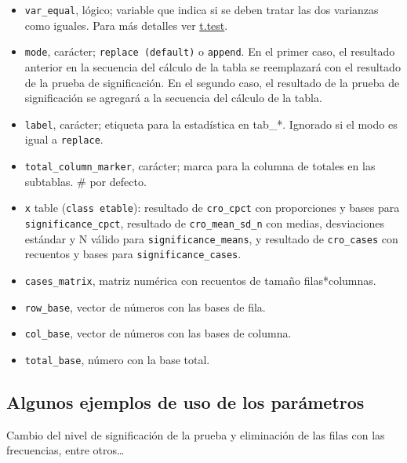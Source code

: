 \documentclass[
]{book}
\begin{document}
\begin{itemize}
\item
  \texttt{var\_equal}, lógico; variable que indica si se deben tratar las dos varianzas como iguales. Para más detalles ver \href{https://www.rdocumentation.org/packages/stats/versions/3.6.2/topics/t.test}{t.test}.
\item
  \texttt{mode}, carácter; \texttt{replace\ (default)} o \texttt{append}. En el primer caso, el resultado anterior en la secuencia del cálculo de la tabla se reemplazará con el resultado de la prueba de significación. En el segundo caso, el resultado de la prueba de significación se agregará a la secuencia del cálculo de la tabla.
\item
  \texttt{label}, carácter; etiqueta para la estadística en tab\_*. Ignorado si el modo es igual a \texttt{replace}.
\item
  \texttt{total\_column\_marker}, carácter; marca para la columna de totales en las subtablas. \# por defecto.
\item
  \texttt{x} table (\texttt{class\ etable}): resultado de \texttt{cro\_cpct} con proporciones y bases para \texttt{significance\_cpct}, resultado de \texttt{cro\_mean\_sd\_n} con medias, desviaciones estándar y N válido para \texttt{significance\_means}, y resultado de \texttt{cro\_cases} con recuentos y bases para \texttt{significance\_cases}.
\item
  \texttt{cases\_matrix}, matriz numérica con recuentos de tamaño filas*columnas.
\item
  \texttt{row\_base}, vector de números con las bases de fila.
\item
  \texttt{col\_base}, vector de números con las bases de columna.
\item
  \texttt{total\_base}, número con la base total.
\end{itemize}

\hypertarget{algunos-ejemplos-de-uso-de-los-paruxe1metros}{%
\subsection{Algunos ejemplos de uso de los parámetros}\label{algunos-ejemplos-de-uso-de-los-paruxe1metros}}

Cambio del nivel de significación de la prueba y eliminación de las filas con las frecuencias, entre otros\ldots{}
\end{document}
